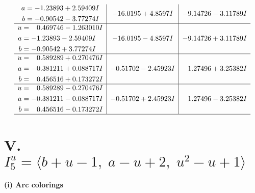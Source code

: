 \documentclass[1p]{elsarticle_modified}
\theoremstyle{definition}
\begin{document}
$$\begin{array}{c|c|c}
\begin{aligned}
a &= -1.23893 + 2.59409 I \\
b &= -0.90542 - 3.77274 I\end{aligned}
 & -16.0195 + 4.8597 I & -9.14726 - 3.11789 I \\ \hline\begin{aligned}
u &= \phantom{-}0.469746 - 1.263010 I \\
a &= -1.23893 - 2.59409 I \\
b &= -0.90542 + 3.77274 I\end{aligned}
 & -16.0195 - 4.8597 I & -9.14726 + 3.11789 I \\ \hline\begin{aligned}
u &= \phantom{-}0.589289 + 0.270476 I \\
a &= -0.381211 + 0.088717 I \\
b &= \phantom{-}0.456516 + 0.173272 I\end{aligned}
 & -0.51702 - 2.45923 I & \phantom{-}1.27496 + 3.25382 I \\ \hline\begin{aligned}
u &= \phantom{-}0.589289 - 0.270476 I \\
a &= -0.381211 - 0.088717 I \\
b &= \phantom{-}0.456516 - 0.173272 I\end{aligned}
 & -0.51702 + 2.45923 I & \phantom{-}1.27496 - 3.25382 I\\
 \hline 
 \end{array}$$\newpage\newpage\renewcommand{\arraystretch}{1}
\centering \section*{V. $I^u_{5}= \langle b+u-1,\;a- u+2,\;u^2- u+1 \rangle$}
\flushleft \textbf{(i) Arc colorings}\\
\end{document}
